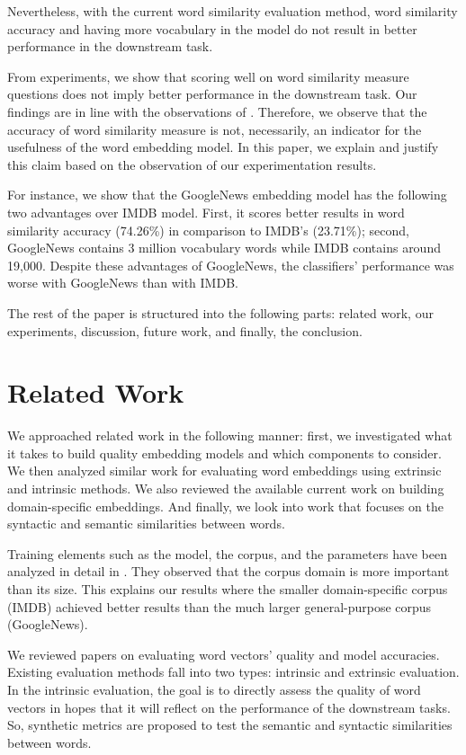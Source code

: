 \documentclass[11pt,letterpaper]{article}
\begin{document}
Nevertheless, with the current word similarity evaluation method, word
similarity accuracy and having more vocabulary in the model do not
result in better performance in the downstream task.

From experiments, we show that scoring well on word similarity measure
questions does not imply better performance in the downstream task. Our
findings are in line with the observations of
\citep{faruqui2016problems}. Therefore, we observe that the accuracy of
word similarity measure is not, necessarily, an indicator for the
usefulness of the word embedding model. In this paper, we explain and
justify this claim based on the observation of our experimentation
results.

For instance, we show that the GoogleNews embedding model has the
following two advantages over IMDB model. First, it scores better
results in word similarity accuracy (74.26\%) in comparison to IMDB's
(23.71\%); second, GoogleNews contains 3 million vocabulary words while
IMDB contains around 19,000. Despite these advantages of GoogleNews, the
classifiers' performance was worse with GoogleNews than with IMDB.

The rest of the paper is structured into the following parts: related
work, our experiments, discussion, future work, and finally, the
conclusion.

\section{Related Work}\label{related-work}

We approached related work in the following manner: first, we
investigated what it takes to build quality embedding models and which
components to consider. We then analyzed similar work for evaluating
word embeddings using extrinsic and intrinsic methods. We also reviewed
the available current work on building domain-specific embeddings. And
finally, we look into work that focuses on the syntactic and semantic
similarities between words.

Training elements such as the model, the corpus, and the parameters have
been analyzed in detail in \citep{lai2016generate}. They observed that
the corpus domain is more important than its size. This explains our
results where the smaller domain-specific corpus (IMDB) achieved better
results than the much larger general-purpose corpus (GoogleNews).

We reviewed papers on evaluating word vectors' quality and model
accuracies. Existing evaluation methods fall into two types: intrinsic
and extrinsic evaluation. In the intrinsic evaluation, the goal is to
directly assess the quality of word vectors in hopes that it will
reflect on the performance of the downstream tasks. So, synthetic
metrics are proposed to test the semantic and syntactic similarities
between words.
\end{document}

